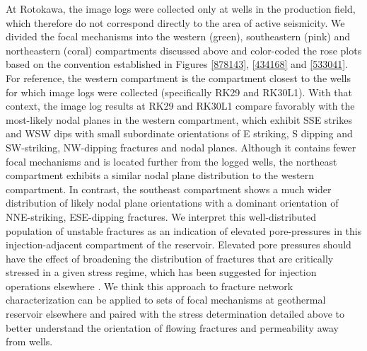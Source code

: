 At Rotokawa, the image logs were collected only at wells in the production field, which therefore do not correspond directly to the area of active seismicity. We divided the focal mechanisms into the western (green), southeastern (pink) and northeastern (coral) compartments discussed above and color-coded the rose plots based on the convention established in Figures \ref{878143}, \ref{434168} and \ref{533041}. For reference, the western compartment is the compartment closest to the wells for which image logs were collected (specifically RK29 and RK30L1). With that context, the image log results at RK29 and RK30L1 compare favorably with the most-likely nodal planes in the western compartment, which exhibit SSE strikes and WSW dips with small subordinate orientations of E striking, S dipping and SW-striking, NW-dipping fractures and nodal planes. Although it contains fewer focal mechanisms and is located further from the logged wells, the northeast compartment exhibits a similar nodal plane distribution to the western compartment. In contrast, the southeast compartment shows a much wider distribution of likely nodal plane orientations with a dominant orientation of NNE-striking, ESE-dipping fractures. We interpret this well-distributed population of unstable fractures as an indication of elevated pore-pressures in this injection-adjacent compartment of the reservoir. Elevated pore pressures should have the effect of broadening the distribution of fractures that are critically stressed in a given stress regime, which has been suggested for injection operations elsewhere \citep[e.g.][]{Bachmann_2012}. We think this approach to fracture network characterization can be applied to sets of focal mechanisms at geothermal reservoir elsewhere and paired with the stress determination detailed above to better understand the orientation of flowing fractures and \gls{permeability} away from wells.